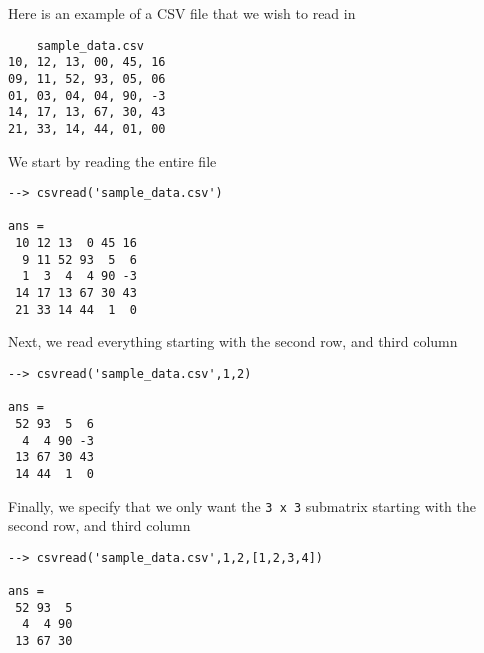 Here is an example of a CSV file that we wish to read in
\begin{verbatim}
    sample_data.csv
10, 12, 13, 00, 45, 16
09, 11, 52, 93, 05, 06
01, 03, 04, 04, 90, -3
14, 17, 13, 67, 30, 43
21, 33, 14, 44, 01, 00
\end{verbatim}
We start by reading the entire file
\begin{verbatim}
--> csvread('sample_data.csv')

ans = 
 10 12 13  0 45 16 
  9 11 52 93  5  6 
  1  3  4  4 90 -3 
 14 17 13 67 30 43 
 21 33 14 44  1  0 
\end{verbatim}
Next, we read everything starting with the second row, and third column
\begin{verbatim}
--> csvread('sample_data.csv',1,2)

ans = 
 52 93  5  6 
  4  4 90 -3 
 13 67 30 43 
 14 44  1  0 
\end{verbatim}
Finally, we specify that we only want the \verb|3 x 3| submatrix starting
with the second row, and third column
\begin{verbatim}
--> csvread('sample_data.csv',1,2,[1,2,3,4])

ans = 
 52 93  5 
  4  4 90 
 13 67 30 
\end{verbatim}
